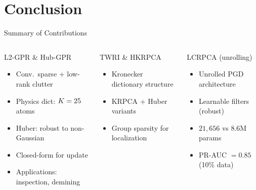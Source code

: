 %

\section{Conclusion}

\begin{frame}{Summary of Contributions}

  \begin{columns}[T]

      \begin{shibuiframe}{L2-GPR \& Hub-GPR}
        \footnotesize
        \begin{itemize}
          \item Conv.\ sparse + low-rank clutter
          \pause
          \item Physics dict: $K = 25$ atoms
          \pause
          \item Huber: robust to non-Gaussian
          \pause
          \item Closed-form for update
          \item Applications: inspection, demining
        \end{itemize}
      \end{shibuiframe}

      \begin{shibuiframe}{TWRI \& HKRPCA}
        \footnotesize
        \begin{itemize}
          \item Kronecker dictionary structure
          \pause
          \item KRPCA + Huber variants
          \pause
          \item Group sparsity for localization
        \end{itemize}
      \end{shibuiframe}

      \begin{shibuiframe}{LCRPCA (unrolling)}
        \footnotesize
        \begin{itemize}
          \item Unrolled PGD architecture
          \pause
          \item Learnable filters (robust)
          \pause
          \item $21{,}656$ vs $8.6\mathrm{M}$ params
          \pause
          \item PR-AUC $= 0.85$ (10\% data)
        \end{itemize}
      \end{shibuiframe}


\end{columns}
\end{frame}
